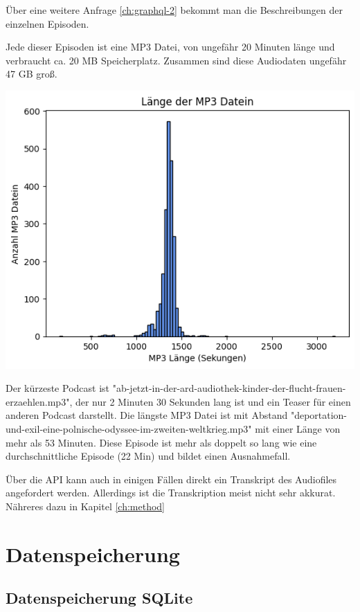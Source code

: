 Über eine weitere Anfrage \autoref{ch:graphql-2} bekommt man die Beschreibungen der einzelnen Episoden. 

Jede dieser Episoden ist eine MP3 Datei, von ungefähr 20 Minuten länge und verbraucht ca. 20 MB Speicherplatz.
Zusammen sind diese Audiodaten ungefähr 47 GB groß. 

\includegraphics[width=\linewidth]{figures/mp3_length.png}

Der kürzeste Podcast ist "ab-jetzt-in-der-ard-audiothek-kinder-der-flucht-frauen-erzaehlen.mp3", der nur 2 Minuten 30 Sekunden lang ist und ein Teaser für einen anderen Podcast darstellt.
Die längste MP3 Datei ist mit Abstand "deportation-und-exil-eine-polnische-odyssee-im-zweiten-weltkrieg.mp3" mit einer Länge von mehr als 53 Minuten.
Diese Episode ist mehr als doppelt so lang wie eine durchschnittliche Episode (22 Min) und bildet einen Ausnahmefall.


Über die API kann auch in einigen Fällen direkt ein Transkript des Audiofiles angefordert werden. 
Allerdings ist die Transkription meist nicht sehr akkurat.
Nähreres dazu in Kapitel \autoref{ch:method}

\section{Datenspeicherung}
\subsection{Datenspeicherung SQLite}

